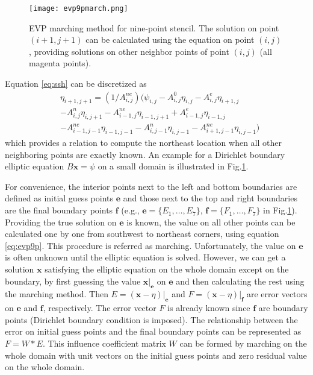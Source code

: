 \begin {figure}[!t]
\centering
\texttt{[image: evp9pmarch.png]}
\caption []{EVP marching method for nine-point stencil. The solution on point $(i+1,j+1)$ can be calculated using the equation on point $(i,j)$, providing solutions on other neighbor points of point $(i,j)$ (all magenta points).  \label {fig:evp9p}}
\end {figure}
Equation \ref{eq:ssh} can be discretized as 
\begin{eqnarray}
\label{eq:evp9p}
&\eta_{i+1,j+1} = (1/A_{i,j}^{ne} )(\psi_{i,j} - A_{i,j}^0\eta_{i,j}-A_{i,j}^e\eta_{i+1,j} \nonumber\\
&-A_{i,j}^n\eta_{i,j+1}-A_{i-1,j}^{ne}\eta_{i-1,j+1} +A_{i-1,j}^e\eta_{i-1,j}\nonumber\\
&-A_{i-1,j-1}^{ne}\eta_{i-1,j-1}-A_{i,j-1}^n\eta_{i,j-1}- A_{i+1,j-1}^{ne}\eta_{i,j-1} )
\end{eqnarray}
which provides a relation to compute the northeast location when all other neighboring points are exactly known.
An example for a Dirichlet boundary elliptic equation $B\textbf{x} = \psi$ on a small domain is illustrated in Fig.\ref{fig:evp9p}. 

For convenience, the interior points next to the left and bottom boundaries
are defined as initial guess points $\textbf{e}$ and those next to the top and right boundaries are the final boundary points $\textbf{f}$
(e.g., $\textbf{e}= \{E_1, \dots, E_7\}$, $\textbf{f}= \{F_1, \dots, F_7\}$ in Fig.\ref{fig:evp9p}).
Providing the true solution on $\textbf{e}$ is known, the value on all other points can be calculated
one by one from southwest to northeast corners, using equation \ref{eq:evp9p}. This procedure is referred as marching. 
Unfortunately, the value on $\textbf{e}$ is often unknown until the elliptic equation is solved. 
However, we can get a solution $\textbf{x}$ satisfying the elliptic equation on the whole domain except on the boundary,
by first guessing the value $\textbf{x}|_\textbf{e}$ on $\textbf{e}$ and then calculating the rest using the marching method. 
Then $E=(\textbf{x} -\eta)|_\textbf{e}$ and $F=(\textbf{x} -\eta)|_\textbf{f}$ are error vectors on $\textbf{e}$ and $\textbf{f}$, respectively. 
The error vector $F$ is already known since $\textbf{f}$ are boundary points (Dirichlet boundary condition is imposed).
The relationship between the error on initial guess points and the final boundary points can be represented as $F=W*E$. 
This influence coefficient matrix $W$ can be formed by marching on the whole domain with unit vectors on the initial guess points and zero residual value on the whole domain. 



